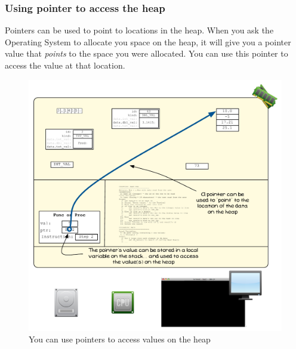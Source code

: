 \clearpage
\subsubsection{Using pointer to access the heap} %
\label{ssub:using_pointer_to_access_the_heap}

Pointers can be used to point to locations in the heap. When you ask the Operating System to allocate you space on the heap, it will give you a pointer value that \emph{points} to the space you were allocated. You can use this pointer to access the value at that location.

\begin{figure}[h]
   \centering
   \includegraphics[width=\textwidth]{./topics/dynamic-memory/diagrams/HeapAccess2} 
   \caption{You can use pointers to access values on the heap}
   \label{fig:heap_access_2}
\end{figure}



